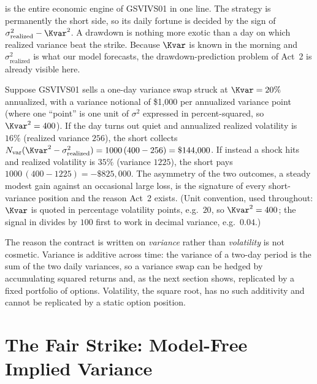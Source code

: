 \begin{projectconnection}
 is the entire economic engine of GSVIVS01 in one line. The strategy is permanently the short side, so its daily fortune is decided by the sign of $\sigma^2_{\text{realized}} - \Kvar^2$. A drawdown is nothing more exotic than a day on which realized variance beat the strike. Because $\Kvar$ is known in the morning and $\sigma^2_{\text{realized}}$ is what our model forecasts, the drawdown-prediction problem of Act~2 is already visible here.
\end{projectconnection}

\begin{workedexample}
Suppose GSVIVS01 sells a one-day variance swap struck at $\Kvar = 20\%$ annualized, with a variance notional of \$1{,}000 per annualized variance point (where one ``point'' is one unit of $\sigma^2$ expressed in percent-squared, so $\Kvar^2 = 400$). If the day turns out quiet and annualized realized volatility is $16\%$ (realized variance $256$), the short collects $N_{\text{var}}(\Kvar^2 - \sigma^2_{\text{realized}}) = 1000\,(400 - 256) = \$144{,}000$. If instead a shock hits and realized volatility is $35\%$ (variance $1225$), the short pays $1000\,(400 - 1225) = -\$825{,}000$. The asymmetry of the two outcomes, a steady modest gain against an occasional large loss, is the signature of every short-variance position and the reason Act~2 exists. (Unit convention, used throughout: $\Kvar$ is quoted in percentage volatility points, e.g.\ $20$, so $\Kvar^2 = 400$; the signal in  divides by $100$ first to work in decimal variance, e.g.\ $0.04$.)
\end{workedexample}

The reason the contract is written on \emph{variance} rather than \emph{volatility} is not cosmetic. Variance is additive across time: the variance of a two-day period is the sum of the two daily variances, so a variance swap can be hedged by accumulating squared returns and, as the next section shows, replicated by a fixed portfolio of options. Volatility, the square root, has no such additivity and cannot be replicated by a static option position.

\section{The Fair Strike: Model-Free Implied Variance}
\label{sec:gsvivs:fair-strike}

